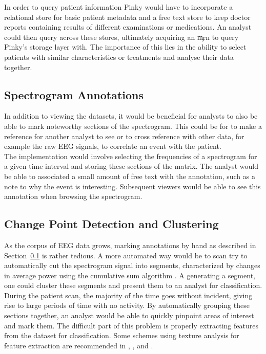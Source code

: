 In order to query patient information Pinky would have to incorporate a
relational store for basic patient metadata and a free text store to keep
doctor reports containing results of different examinations or medications. An
analyst could then query across these stores, ultimately acquiring an \c{mrn}
to query Pinky's storage layer with. The importance of this lies in the ability
to select patients with similar characteristics or treatments and analyse their
data together.

\subsection{Spectrogram Annotations}\label{discuss-ch:annotations}

In addition to viewing the datasets, it would be beneficial for analysts to
also be able to mark noteworthy sections of the spectrogram. This could be for
to make a reference for another analyst to see or to cross reference with other
data, for example the raw EEG signals, to correlate an event with the patient. \\

The implementation would involve selecting the frequencies of a spectrogram for
a given time interval and storing these sections of the matrix.  The analyst
would be able to associated a small amount of free text with the annotation,
such as a note to why the event is interesting. Subsequent viewers would be
able to see this annotation when browsing the spectrogram.

\subsection{Change Point Detection and Clustering}\label{discuss-ch:cpd}

As the corpus of EEG data grows, marking annotations by hand as described in
Section~\ref{discuss-ch:annotations} is rather tedious.  A more automated way
would be to scan try to automatically cut the spectrogram signal into segments,
characterized by changes in average power using the cumulative sum algorithm
\cite{cumsum}. A generating a segment, one could cluster these segments and
present them to an analyst for classification. During the patient scan, the
majority of the time goes without incident, giving rise to large periods of
time with no activity. By automatically grouping these sections together, an
analyst would be able to quickly pinpoint areas of interest and mark them. The
difficult part of this problem is properly extracting features from the dataset
for classification. Some schemes using texture analysis for feature extraction
are recommended in \cite{texture-classification1},
\cite{texture-classification2}, and \cite{auto-segment}. \\

